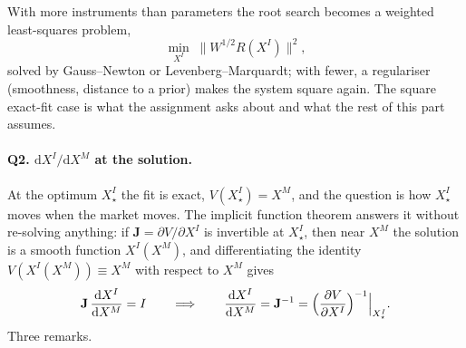 \documentclass[11pt]{article}
\newcommand{\XI}{X^{I}}
\newcommand{\XM}{X^{M}}
\newcommand{\J}{\mathbf{J}}
\newcommand{\dd}{\mathrm{d}}
\begin{document}
With more instruments than parameters the root search becomes a weighted least-squares problem,
\[
\min_{\XI}\;\bigl\|W^{1/2}R(\XI)\bigr\|^2,
\]
solved by Gauss--Newton or Levenberg--Marquardt; with fewer, a regulariser (smoothness, distance to a prior) makes the system square again. The square exact-fit case is what the assignment asks about and what the rest of this part assumes.

\paragraph{Q2. $\dd\XI/\dd\XM$ at the solution.}
At the optimum $\XI_\star$ the fit is exact, $V(\XI_\star)=\XM$, and the question is how $\XI_\star$ moves when the market moves. The implicit function theorem answers it without re-solving anything: if $\J=\partial V/\partial\XI$ is invertible at $\XI_\star$, then near $\XM$ the solution is a smooth function $\XI(\XM)$, and differentiating the identity $V(\XI(\XM))\equiv\XM$ with respect to $\XM$ gives
\[
\J\,\frac{\dd\XI}{\dd\XM}=I
\qquad\Longrightarrow\qquad
\frac{\dd\XI}{\dd\XM}=\J^{-1}=\Bigl(\frac{\partial V}{\partial\XI}\Bigr)^{-1}\Big|_{\XI_\star}.
\]
Three remarks.
\end{document}
